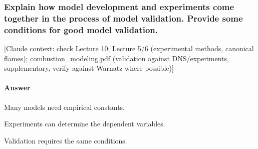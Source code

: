 \subsubsection{Explain how model development and experiments come together in the process of model validation. Provide some conditions for good model validation.}

{\color{gray}\footnotesize [Claude context: check Lecture 10; Lecture 5/6 (experimental methods, canonical flames); combustion\_modeling.pdf (validation against DNS/experiments, supplementary, verify against Warnatz where possible)]}

\paragraph{Answer}  Many models need empirical constants.

Experiments can determine the dependent variables.

Validation requires the same conditions.

